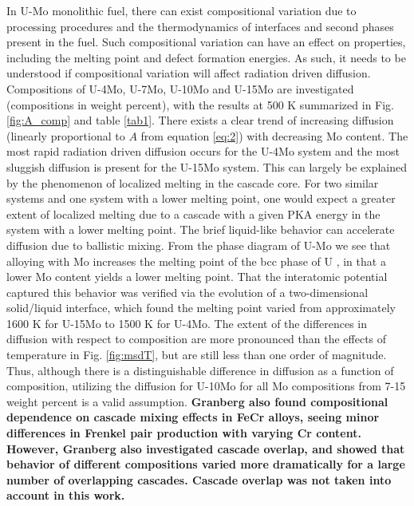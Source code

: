 \documentclass[review]{elsarticle}
\providecommand{\DIFaddtex}[1]{{\bf #1}} %
\providecommand{\DIFaddbegin}{\protect\color{blue}} %
\providecommand{\DIFaddend}{\protect\color{black}} %
\providecommand{\DIFadd}[1]{\texorpdfstring{\DIFaddtex{#1}}{#1}} %
\newcommand{\DIFaddincludegraphics}[2][]{{\color{blue}\fbox{\DIFOincludegraphics[#1]{#2}}}} %
\DeclareRobustCommand{\DIFaddbegin}{\DIFOaddbegin \let\includegraphics\DIFaddincludegraphics} %
\DeclareRobustCommand{\DIFaddend}{\DIFOaddend \let\includegraphics\DIFOincludegraphics} %
\begin{document}
In U-Mo monolithic fuel, there can exist compositional variation due to processing procedures and the thermodynamics of interfaces and second phases present in the fuel. Such compositional variation can have an effect on properties, including the melting point and defect formation energies. As such, it needs to be understood if compositional variation will affect radiation driven diffusion. Compositions of U-4Mo, U-7Mo, U-10Mo and U-15Mo are investigated (compositions in weight percent), with the results at 500 K summarized in Fig. \ref{fig:A_comp} and table \ref{tab1}. There exists a clear trend of increasing diffusion (linearly proportional to $A$ from equation \ref{eq:2}) with decreasing Mo content. The most rapid radiation driven diffusion occurs for the U-4Mo system and the most sluggish diffusion is present for the U-15Mo system. This can largely be explained by the phenomenon of localized melting in the cascade core. For two similar systems and one system with a lower melting point, one would expect a greater extent of localized melting due to a cascade with a given PKA energy in the system with a lower melting point. The brief liquid-like behavior can accelerate diffusion due to ballistic mixing. From the phase diagram of U-Mo we see that alloying with Mo increases the melting point of the bcc phase of U \cite{umo_handbook}, in that a lower Mo content yields a lower melting point. That the interatomic potential captured this behavior was verified via the evolution of a two-dimensional solid/liquid interface, which found the melting point varied from approximately 1600 K for U-15Mo to 1500 K for U-4Mo. The extent of the differences in diffusion with respect to composition are more pronounced than the effects of temperature in Fig. \ref{fig:msdT}, but are still less than one order of magnitude. Thus, although there is a distinguishable difference in diffusion as a function of composition, utilizing the diffusion for U-10Mo for all Mo compositions from 7-15 weight percent is a valid assumption. \DIFaddbegin \DIFadd{Granberg \cite{granberg2020} also found compositional dependence on cascade mixing effects in FeCr alloys, seeing minor differences in Frenkel pair production with varying Cr content. However, Granberg also investigated cascade overlap, and showed that behavior of different compositions varied more dramatically for a large number of overlapping cascades. Cascade overlap was not taken into account in this work. 
}\DIFaddend 
\end{document}
